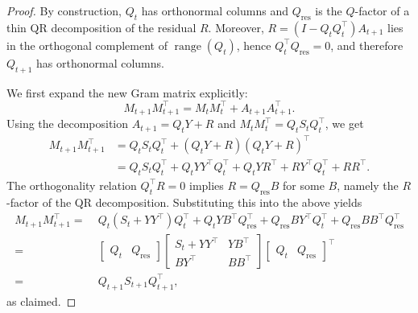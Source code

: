\documentclass[10pt]{article} %
\begin{document}
\begin{proof}
By construction, $Q_t$ has orthonormal columns and $Q_{\mathrm{res}}$ is the
$Q$-factor of a thin QR decomposition of the residual $R$. Moreover,
$R=(I-Q_t Q_t^\top)A_{t+1}$ lies in the orthogonal complement of
$\operatorname{range}(Q_t)$, hence
$Q_t^\top Q_{\mathrm{res}} = 0$, and therefore $Q_{t+1}$ has orthonormal
columns.

We first expand the new Gram matrix explicitly:
\[
  M_{t+1} M_{t+1}^\top
  = M_t M_t^\top + A_{t+1} A_{t+1}^\top.
\]
Using the decomposition $A_{t+1} = Q_t Y + R$ and $M_t M_t^\top = Q_t S_t Q_t^\top$,
we get
\[
  \begin{aligned}
  M_{t+1} M_{t+1}^\top
  &= Q_t S_t Q_t^\top
     + (Q_t Y + R)(Q_t Y + R)^\top \\
  &= Q_t S_t Q_t^\top
     + Q_t Y Y^\top Q_t^\top
     + Q_t Y R^\top
     + R Y^\top Q_t^\top
     + R R^\top.
  \end{aligned}
\]
The orthogonality relation $Q_t^\top R = 0$ implies $R = Q_{\mathrm{res}} B$
for some $B$, namely the $R$-factor of the QR decomposition. Substituting this
into the above yields
\[
  \begin{aligned}
  M_{t+1} M_{t+1}^\top
  =&\;
  Q_t (S_t + Y Y^\top) Q_t^\top
  + Q_t Y B^\top Q_{\mathrm{res}}^\top
  + Q_{\mathrm{res}} B Y^\top Q_t^\top
  + Q_{\mathrm{res}} B B^\top Q_{\mathrm{res}}^\top \\[0.3em]
  =&\;
  \begin{bmatrix}Q_t & Q_{\mathrm{res}}\end{bmatrix}
  \begin{bmatrix}
    S_t + Y Y^\top & Y B^\top\\
    B Y^\top       & B B^\top
  \end{bmatrix}
  \begin{bmatrix}Q_t & Q_{\mathrm{res}}\end{bmatrix}^\top \\
  =&\; Q_{t+1} S_{t+1} Q_{t+1}^\top,
  \end{aligned}
\]
as claimed.
\end{proof}
\end{document}
